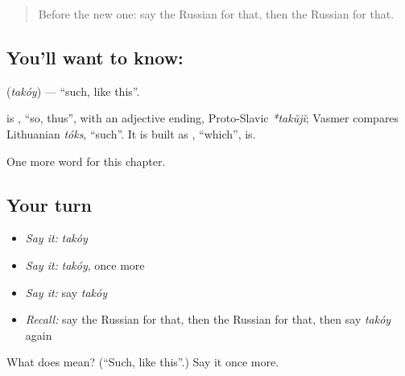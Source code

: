 \label{lesson:RU-C82-such}



\begin{quote}
Before the new one: say the Russian for that, then the Russian for that.
\end{quote}

\subsection*{You'll want to know: }
\textbf{} (\emph{takóy}) — \textquotedblleft{}such, like this\textquotedblright{}.

\begin{cousinweb}
\textbf{} is \emph{}, \textquotedblleft{}so, thus\textquotedblright{}, with an adjective ending, Proto-Slavic \emph{*takŭjĭ}; Vasmer compares Lithuanian \emph{tóks}, \textquotedblleft{}such\textquotedblright{}. It is built as \emph{}, \textquotedblleft{}which\textquotedblright{}, is.
\end{cousinweb}

\begin{grammarlens}[title={What you've built}]
One more word for this chapter.
\end{grammarlens}

\subsection*{Your turn}
\begin{itemize}
\raggedright
  \item \emph{Say it:} \emph{takóy}
  \item \emph{Say it:} \emph{takóy}, once more
  \item \emph{Say it:} say \emph{takóy}
  \item \emph{Recall:} say the Russian for that, then the Russian for that, then say \emph{takóy} again
\end{itemize}

\begin{tcolorbox}[breakable,colback=teal!4,colframe=teal!35!black,title={Before you move on}]
What does  mean? (\textquotedblleft{}Such, like this\textquotedblright{}.) Say it once more.
\end{tcolorbox}
